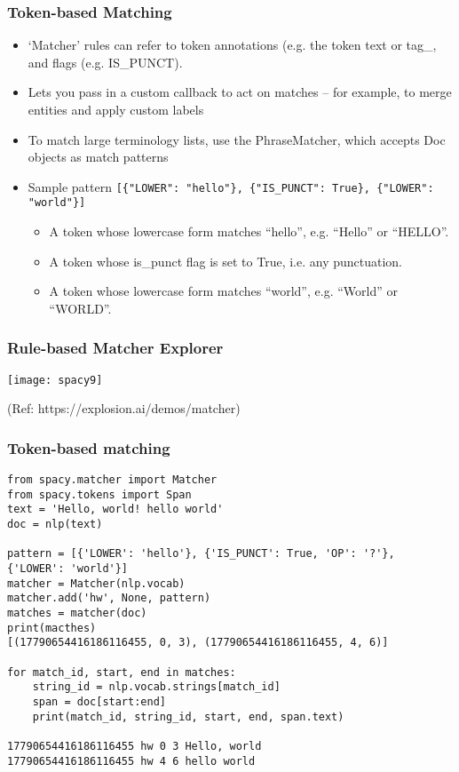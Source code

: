 \begin{frame}[fragile]\frametitle{Token-based Matching }

  \begin{itemize}
    \item `Matcher' rules can refer to token annotations (e.g. the token text or tag\_, and flags (e.g. IS\_PUNCT).
		\item Lets you pass in a custom callback to act on matches – for example, to merge entities and apply custom labels
		\item To match large terminology lists, use the PhraseMatcher, which accepts Doc objects as match patterns
		\item Sample pattern \lstinline|[{"LOWER": "hello"}, {"IS_PUNCT": True}, {"LOWER": "world"}]|
  \begin{itemize}
    \item A token whose lowercase form matches “hello”, e.g. “Hello” or “HELLO”.
    \item A token whose is\_punct flag is set to True, i.e. any punctuation.
    \item A token whose lowercase form matches “world”, e.g. “World” or “WORLD”.
  \end{itemize}		
  \end{itemize}
	
\end{frame}


\begin{frame}[fragile]\frametitle{Rule-based Matcher Explorer}

\begin{center}
\texttt{[image: spacy9]}
\end{center}

{\tiny (Ref: https://explosion.ai/demos/matcher)}
\end{frame}


\begin{frame}[fragile]\frametitle{Token-based matching }

\begin{lstlisting}
from spacy.matcher import Matcher
from spacy.tokens import Span
text = 'Hello, world! hello world'
doc = nlp(text)

pattern = [{'LOWER': 'hello'}, {'IS_PUNCT': True, 'OP': '?'}, {'LOWER': 'world'}]
matcher = Matcher(nlp.vocab)
matcher.add('hw', None, pattern)
matches = matcher(doc)
print(macthes)
[(17790654416186116455, 0, 3), (17790654416186116455, 4, 6)]

for match_id, start, end in matches:
    string_id = nlp.vocab.strings[match_id]
    span = doc[start:end]
    print(match_id, string_id, start, end, span.text)
		
17790654416186116455 hw 0 3 Hello, world
17790654416186116455 hw 4 6 hello world		
\end{lstlisting}
	
\end{frame}

